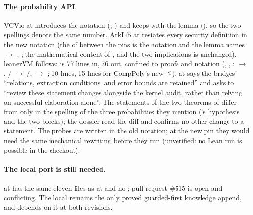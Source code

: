 \paragraph{The probability API.} VCVio at  introduces the notation
 (, \allowbreak{}\allowbreak{}) and
keeps  with the lemma 
(\allowbreak{}\allowbreak{}\allowbreak{}), so the two spellings denote the same number. ArkLib
at  restates every security definition in the new notation (the  of
\allowbreak{} between the pins is the notation and the lemma names
 $\to$ , ; the mathematical content
of ,  and the two
implications is unchanged). leanerVM  follows:
 is 77 lines in, 76 out, confined to proofs and
notation (, , :
 $\to$ , / $\to$
/,  $\to$ ;
 10 lines,  15 lines for CompPoly's new $\mathbb{K}$).
\allowbreak{} at  says the bridges' \enquote{relations, extraction
conditions, and error bounds are retained} and asks to \enquote{review these statement changes
alongside the kernel audit, rather than relying on successful elaboration alone}. The statements
of the two theorems of  differ from  only in the spelling
of the three probabilities they mention ('s hypothesis and the two 
blocks); the dossier read the diff and confirms no other change to a statement. The probes are
written in the old notation; at the new pin they would need the same mechanical rewriting before
they run (unverified: no Lean run is possible in the checkout).

\paragraph{The local port is still needed.} \allowbreak{}\allowbreak{} at
 has the same eleven files as at  and no ; pull
request \#615 is open and conflicting. The local  remains the only
proved guarded-first knowledge append, and  depends on it at both
revisions.

